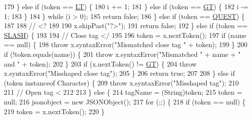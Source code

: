 \begin{DoxyCode}
179                 \} \textcolor{keywordflow}{else} \textcolor{keywordflow}{if} (token == \hyperlink{classorg_1_1json_1_1_x_m_l_a12c351d05c7c78c4730d1ec44ae6b798}{LT}) \{
180                     i += 1;
181                 \} \textcolor{keywordflow}{else} \textcolor{keywordflow}{if} (token == \hyperlink{classorg_1_1json_1_1_x_m_l_a0a9f1aaef15f78d43c532e601546a722}{GT}) \{
182                     i -= 1;
183                 \}
184             \} \textcolor{keywordflow}{while} (i > 0);
185             \textcolor{keywordflow}{return} \textcolor{keyword}{false};
186         \} \textcolor{keywordflow}{else} \textcolor{keywordflow}{if} (token == \hyperlink{classorg_1_1json_1_1_x_m_l_a6ee91c7c64c44b62b197a69b00ee383f}{QUEST}) \{
187 
188 \textcolor{comment}{// <?}
189 
190             x.skipPast(\textcolor{stringliteral}{"?>"});
191             \textcolor{keywordflow}{return} \textcolor{keyword}{false};
192         \} \textcolor{keywordflow}{else} \textcolor{keywordflow}{if} (token == \hyperlink{classorg_1_1json_1_1_x_m_l_aaa9a255bc94655b02d65b2c8525e5188}{SLASH}) \{
193 
194 \textcolor{comment}{// Close tag </}
195 
196             token = x.nextToken();
197             \textcolor{keywordflow}{if} (name == null) \{
198                 \textcolor{keywordflow}{throw} x.syntaxError(\textcolor{stringliteral}{"Mismatched close tag "} + token);
199             \}
200             \textcolor{keywordflow}{if} (!token.equals(name)) \{
201                 \textcolor{keywordflow}{throw} x.syntaxError(\textcolor{stringliteral}{"Mismatched "} + name + \textcolor{stringliteral}{" and "} + token);
202             \}
203             \textcolor{keywordflow}{if} (x.nextToken() != \hyperlink{classorg_1_1json_1_1_x_m_l_a0a9f1aaef15f78d43c532e601546a722}{GT}) \{
204                 \textcolor{keywordflow}{throw} x.syntaxError(\textcolor{stringliteral}{"Misshaped close tag"});
205             \}
206             \textcolor{keywordflow}{return} \textcolor{keyword}{true};
207 
208         \} \textcolor{keywordflow}{else} \textcolor{keywordflow}{if} (token instanceof Character) \{
209             \textcolor{keywordflow}{throw} x.syntaxError(\textcolor{stringliteral}{"Misshaped tag"});
210 
211 \textcolor{comment}{// Open tag <}
212 
213         \} \textcolor{keywordflow}{else} \{
214             tagName = (String)token;
215             token = null;
216             jsonobject = \textcolor{keyword}{new} JSONObject();
217             \textcolor{keywordflow}{for} (;;) \{
218                 \textcolor{keywordflow}{if} (token == null) \{
219                     token = x.nextToken();
220                 \}

\end{DoxyCode}
